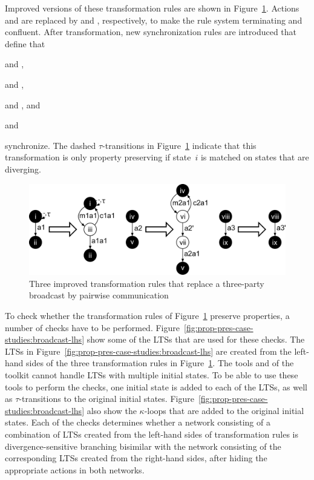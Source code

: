 Improved versions of these transformation rules are shown in Figure~\ref{fig:prop-pres-case-studies:broadcast-rules}.
Actions~ and  are replaced by  and , respectively, to make the rule system terminating and confluent.
After transformation, new synchronization rules are introduced that define that
\begin{itemize*}
\item {} and ,
\item {} and ,
\item {} and , and
\item {} and 
\end{itemize*}
synchronize.
The dashed $\tau$-transitions in Figure~\ref{fig:prop-pres-case-studies:broadcast-rules} indicate that this transformation is only property preserving if state~$i$ is matched on states that are diverging.

\begin{figure}[hbt]
\centering
\includegraphics[scale=0.2]{prop-pres-case-studies/figs/broadcast-rules}
\caption{Three improved transformation rules that replace a three-party broadcast by pairwise communication}
\label{fig:prop-pres-case-studies:broadcast-rules}
\end{figure}

To check whether the transformation rules of Figure~\ref{fig:prop-pres-case-studies:broadcast-rules} preserve properties, a number of checks have to be performed.
Figure~\ref{fig:prop-pres-case-studies:broadcast-lhs} show some of the LTSs that are used for these checks.
The LTSs in Figure~\ref{fig:prop-pres-case-studies:broadcast-lhs} are created from the left-hand sides of the three transformation rules in Figure~\ref{fig:prop-pres-case-studies:broadcast-rules}.
The tools \EXPOPEN and \ltscompare of the \mCRLTwo toolkit cannot handle LTSs with multiple initial states.
To be able to use these tools to perform the checks, one initial state is added to each of the LTSs, as well as $\tau$-transitions to the original initial states.
Figure~\ref{fig:prop-pres-case-studies:broadcast-lhs} also show the $\kappa$-loops that are added to the original initial states.
Each of the checks determines whether a network consisting of a combination of LTSs created from the left-hand sides of transformation rules is divergence-sensitive branching bisimilar with the network consisting of the corresponding LTSs created from the right-hand sides, after hiding the appropriate actions in both networks.

